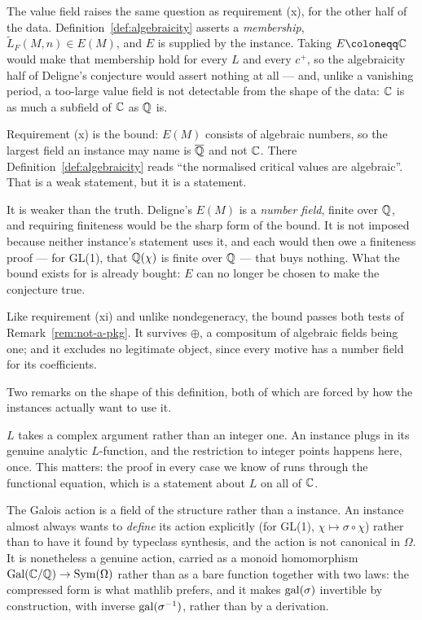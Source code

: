 \begin{remark}
  \label{rem:valueField-bounded}
  The value field raises the same question as requirement (x), for the other half of the data.
  Definition~\ref{def:algebraicity} asserts a \emph{membership},
  $\widetilde{L}_{F}(M,n) \in E(M)$, and $E$ is supplied by the instance. Taking
  $E \coloneqq \C$ would make that membership hold for every $L$ and every $c^{+}$, so the
  algebraicity half of Deligne's conjecture would assert nothing at all --- and, unlike a
  vanishing period, a too-large value field is not detectable from the shape of the data: $\mathbb{C}$
  is as much a subfield of $\mathbb{C}$ as $\mathbb{Q}$ is.

  Requirement (x) is the bound: $E(M)$ consists of algebraic numbers, so the largest field an
  instance may name is $\overline{\mathbb{Q}}$ and not $\mathbb{C}$. There Definition~\ref{def:algebraicity} reads
  ``the normalised critical values are algebraic''. That is a weak statement, but it is a
  statement.

  It is weaker than the truth. Deligne's $E(M)$ is a \emph{number field}, finite over $\mathbb{Q}$, and
  requiring finiteness would be the sharp form of the bound. It is not imposed because
  neither instance's statement uses it, and each would then owe a finiteness proof --- for
  GL(1), that $\mathbb{Q}(\chi)$ is finite over $\mathbb{Q}$ --- that buys nothing. What the bound exists for
  is already bought: $E$ can no longer be chosen to make the conjecture true.

  Like requirement (xi) and unlike nondegeneracy, the bound passes both tests of
  Remark~\ref{rem:not-a-pkg}. It survives $\oplus$, a compositum of algebraic fields being
  one; and it excludes no legitimate object, since every motive has a number field for its
  coefficients.
\end{remark}

Two remarks on the shape of this definition, both of which are forced by how the
instances actually want to use it.

\begin{remark}
  $L$ takes a complex argument rather than an integer one. An instance plugs in its
  genuine analytic $L$-function, and the restriction to integer points happens here,
  once. This matters: the proof in every case we know of runs through the functional
  equation, which is a statement about $L$ on all of $\mathbb{C}$.
\end{remark}

\begin{remark}
  The Galois action is a field of the structure rather than a 
  instance. An instance almost always wants to \emph{define} its action explicitly
  (for GL(1), $\chi \mapsto \sigma \circ \chi$) rather than to have it found by
  typeclass synthesis, and the action is not canonical in $\Omega$. It is nonetheless a genuine
  action, carried as a monoid homomorphism
  $\operatorname{Gal}(\mathbb{C}/\mathbb{Q}) \to \operatorname{Sym}(\Omega)$ rather than as a bare function together
  with two laws: the compressed form is what mathlib prefers, and it makes $\mathrm{gal}(\sigma)$
  invertible by construction, with inverse $\mathrm{gal}(\sigma^{-1})$, rather than by a derivation.
\end{remark}

